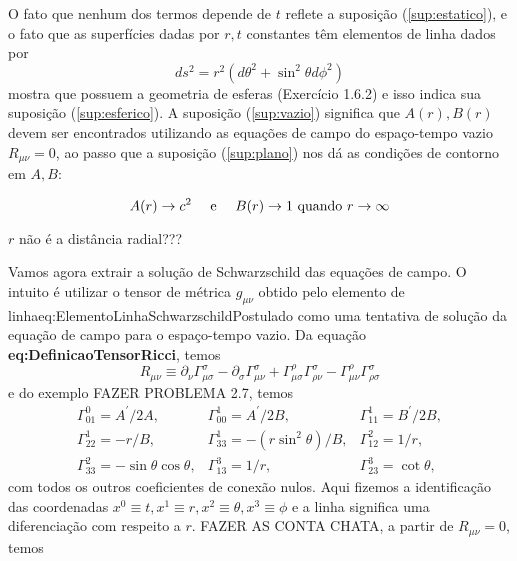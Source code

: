 O fato que nenhum dos termos depende de $t$ reflete a suposição (\ref{sup:estatico}), e o fato que as superfícies dadas por $r,t$ constantes têm elementos de linha dados por
\begin{equation}\label{eq:RTConstantes}
	d s^{2}=r^{2}\left(d \theta^{2}+\sin ^{2} \theta d \phi^{2}\right)
\end{equation}
mostra que possuem a geometria de esferas {\color{red}(Exercício 1.6.2)} e isso indica sua suposição (\ref{sup:esferico}). A suposição (\ref{sup:vazio}) significa que $A(r), B(r)$ devem ser encontrados utilizando as equações de campo do espaço-tempo vazio $R_{\mu\nu}=0$, ao passo que a suposição (\ref{sup:plano}) nos dá as condições de contorno em $A,B$:

\begin{equation}\label{eq:CondicoesContornoSchwarzschild}
	A(r) \rightarrow c^{2} \qq{ e } B(r) \rightarrow 1 \text { quando } r \rightarrow \infty
\end{equation}

{\color{red} $r$ não é a distância radial???}

Vamos agora extrair a solução de Schwarzschild das equações de campo. O intuito é utilizar o tensor de métrica $g_{\mu\nu}$ obtido pelo elemento de linha{eq:ElementoLinhaSchwarzschildPostulado} como uma tentativa de solução da equação de campo para o espaço-tempo vazio. Da equação \textbf{eq:DefinicaoTensorRicci}, temos 
\[
R_{\mu \nu} \equiv \partial_{\nu} \Gamma_{\mu \sigma}^{\sigma}-\partial_{\sigma} \Gamma_{\mu \nu}^{\sigma}+\Gamma_{\mu \sigma}^{\rho} \Gamma_{\rho \nu}^{\sigma}-\Gamma_{\mu \nu}^{\rho} \Gamma_{\rho \sigma}^{\sigma}
\]
e do exemplo {\color{red} FAZER PROBLEMA 2.7}, temos
\[
\begin{array}{lll}
{\Gamma_{01}^{0}=A^{\prime} / 2 A,} & {\Gamma_{00}^{1}=A^{\prime} / 2 B,} & {\Gamma_{11}^{1}=B^{\prime} / 2 B,} \\ 
{\Gamma_{22}^{1}=-r / B,} & {\Gamma_{33}^{1}=-\left(r \sin ^{2} \theta\right) / B,} &{ \Gamma_{12}^{2}=1 / r,} \\ 
{\Gamma_{33}^{2}=-\sin \theta \cos \theta,} & {\Gamma_{13}^{3}=1 / r,} & {\Gamma_{23}^{3}=\cot \theta,}
\end{array}	
\]
com todos os outros coeficientes de conexão nulos. Aqui fizemos a identificação das coordenadas $x^0\equiv t, x^1\equiv r, x^2\equiv\theta,x^3\equiv\phi$ e a linha significa uma diferenciação com respeito a $r$. 
{\color{red} FAZER AS CONTA CHATA, a partir de $R_{\mu\nu}=0$}, temos


